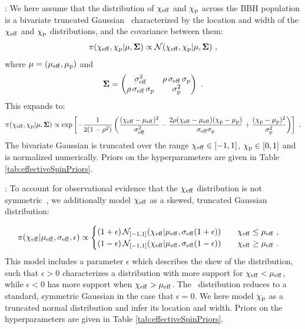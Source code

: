 \effectiveSpinModel: We here assume that the distribution of $\chi_{\rm eff}$ and $\chi_\mathrm{p}$ across the \ac{BBH} population is a bivariate truncated Gaussian~\citep{Miller:2020zox, Roulet:2018jbe} characterized by the location and width of the $\chi_{\rm eff}$ and $\chi_\mathrm{p}$ distributions, and the covariance between them:
\begin{equation}
    \pi(\chi_{\rm eff}, \chi_\mathrm{p} | \mathbf{\mu}, \mathbf{\Sigma}) \propto \mathcal{N}(\chi_{\rm eff}, \chi_\mathrm{p} | \mathbf{\mu}, \mathbf{\Sigma}) \,\, ,
\end{equation}
where $\mathbf \mu =(\mu_{\rm eff}, \mu_{\rm p})$ and
\begin{equation}
    \mathbf{\Sigma} =
    \begin{pmatrix}
        \sigma_{\rm eff}^2 & \rho\,\sigma_{\rm eff}\,\sigma_{\rm p} \\
        \rho\,\sigma_{\text{eff}}\,\sigma_{\rm p} & \sigma_{\rm p}^2
    \end{pmatrix}   \,\,.
\end{equation}
This expands to: 
\begin{equation}
    \pi(\chi_{\rm eff}, \chi_\mathrm{p} | \mathbf{\mu}, \mathbf{\Sigma}) \propto 
    \exp\left[ -\frac{1}{2(1 - \rho^2)}
    \left( \frac{(\chi_{\rm eff} - \mu_{\rm eff})^2}{\sigma_{\rm eff} ^2} 
    - \frac{2\rho (\chi_{\rm eff} - \mu_{\rm eff})(\chi_{\rm p} - \mu_{\rm p})}{\sigma_{\rm eff}\sigma_{\rm p}}
    + \frac{(\chi_{\rm p} - \mu_{\rm p})^2}{\sigma_{\rm p} ^2} \right) \right]\,\,.
    \label{eqn:chi_eff_chi_p_gaussian_model} 
\end{equation}
%
The bivariate Gaussian is truncated over the range $\chi_{\rm eff} \in [-1,1]$, $\chi_\mathrm{p}\in[0,1]$ and is normalized numerically.
Priors on the hyperparameters are given in Table \ref{tab:effectiveSpinPriors}.

\skewnormalChiEff: To account for observational evidence that the $\chi_{\rm eff}$ distribution is not symmetric~\citep{Callister:2021fpo,Adamcewicz:2022hce,Banagiri:2025dxo}, we additionally model $\chi_{\rm eff}$ as a skewed, truncated Gaussian distribution:

\begin{equation}
    \pi(\chi_{\rm eff}|\mu_{\rm eff}, \sigma_{\rm eff}, \epsilon) \propto 
	\begin{cases} 
        (1 + \epsilon) \, \mathcal{N}_{[-1,1]}(\chi_{\rm eff} | \mu_{\rm eff}, \sigma_{\rm eff} (1 + \epsilon)) \qquad \chi_{\rm eff} \leq \mu_{\rm eff} \,\, ,\\ 
        (1 - \epsilon) \, \mathcal{N}_{[-1,1]}(\chi_{\rm eff} | \mu_{\rm eff}, \sigma_{\rm eff} (1 - \epsilon)) \qquad \chi_{\rm eff} \geq \mu_{\rm eff} \,\,.
	\end{cases}
    \label{eqn:chi_eff_skewnormal_model} 
\end{equation}
%
This model includes a parameter $\epsilon$ which describes the skew of the distribution, such that  $\epsilon > 0$ characterizes a distribution with more support for $\chi_{\rm eff}<\mu_{\rm eff}$, while $\epsilon < 0$ has more support when $\chi_{\rm eff}>\mu_{\rm eff}$. 
The \skewnormalChiEff~distribution reduces to a standard, symmetric Gaussian in the case that $\epsilon=0$.
We here model $\chi_\mathrm{p}$ as a truncated normal distribution and infer its location and width. 
Priors on the hyperparameters are given in Table \ref{tab:effectiveSpinPriors}.

